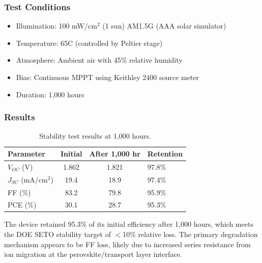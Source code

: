 \documentclass[
    language=english,
    doctype=research-notebook,
    institution=none,
]{../../omnilatex}
\begin{document}
\subsubsection{Test Conditions}
\begin{itemize}
    \item Illumination: 100 mW/cm$^2$ (1 sun) AM1.5G (AAA solar simulator)
    \item Temperature: 65\degree C (controlled by Peltier stage)
    \item Atmosphere: Ambient air with 45\% relative humidity
    \item Bias: Continuous MPPT using Keithley 2400 source meter
    \item Duration: 1,000 hours
\end{itemize}

\subsubsection{Results}
\begin{table}[htbp]
    \centering
    \caption{Stability test results at 1,000 hours.}
    \label{tab:stability-results}
    \begin{tabular}{@{}lcc@{}}
        \toprule
        Parameter & Initial & After 1,000 hr & Retention \\
        \midrule
        $V_{OC}$ (V)         & 1.862  & 1.821   & 97.8\% \\
        $J_{SC}$ (mA/cm$^2$) & 19.4   & 18.9    & 97.4\% \\
        FF (\%)               & 83.2   & 79.8    & 95.9\% \\
        PCE (\%)              & 30.1   & 28.7    & 95.3\% \\
        \bottomrule
    \end{tabular}
\end{table}

The device retained 95.3\% of its initial efficiency after 1,000 hours,
which meets the DOE SETO stability target of $<$10\% relative loss.
The primary degradation mechanism appears to be FF loss, likely due to
increased series resistance from ion migration at the perovskite/transport
layer interface.
\end{document}
